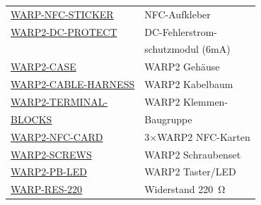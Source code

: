 \documentclass[a4paper,10pt]{article}
\begin{document}
\begin{multicols*}{2}
\begin{tabular}{ll}
        \cmidrule(lr{0.5em}){1-2}
        \href{https://www.tinkerforge.com/de/shop/warp/warp2-spare-parts/warp-nfc-sticker.html}{WARP-NFC-STICKER}                   & NFC-Aufkleber                        \\
        \cmidrule(lr{0.5em}){1-2}
        \href{https://www.tinkerforge.com/de/shop/warp/warp2-spare-parts/warp2-dc-protect.html}{WARP2-DC-PROTECT}                   & DC-Fehlerstrom-                      \\
                                                                                                                                    & schutzmodul (6mA)                    \\
        \cmidrule(lr{0.5em}){1-2}
        \href{https://www.tinkerforge.com/de/shop/warp/warp2-spare-parts.html}{WARP2-CASE}                                          & WARP2 Gehäuse                        \\
        \cmidrule(lr{0.5em}){1-2}
        \small{\href{https://www.tinkerforge.com/de/shop/warp/warp2-spare-parts/warp2-cable-harness.html}{WARP2-CABLE-HARNESS}}     & WARP2 Kabelbaum                      \\
        \cmidrule(lr{0.5em}){1-2}
        \href{https://www.tinkerforge.com/de/shop/warp/warp2-spare-parts/warp2-terminal-blocks.html}{WARP2-TERMINAL-}               & WARP2 Klemmen-                       \\
        \href{https://www.tinkerforge.com/de/shop/warp/warp2-spare-parts/warp2-terminal-blocks.html}{BLOCKS}                        & Baugruppe                            \\
        \cmidrule(lr{0.5em}){1-2}
        \href{https://www.tinkerforge.com/de/shop/warp/warp2-spare-parts/warp2-nfc-karte.html}{WARP2-NFC-CARD}                      & 3$\times$WARP2 NFC-Karten            \\
        \cmidrule(lr{0.5em}){1-2}
        \href{https://www.tinkerforge.com/de/shop/warp/warp2-spare-parts/warp2-screws.html}{WARP2-SCREWS}                           & WARP2 Schraubenset                   \\
        \cmidrule(lr{0.5em}){1-2}
        \href{https://www.tinkerforge.com/de/shop/warp/warp2-spare-parts/warp2-pb-led-set.html}{WARP2-PB-LED}                       & WARP2 Taster/LED                     \\
        \cmidrule(lr{0.5em}){1-2}
        \href{https://www.tinkerforge.com/de/shop/warp/warp2-spare-parts/warp-res-220.html}{WARP-RES-220}                           & Widerstand \SI{220}{\ohm}            \\

\end{tabular}
\end{multicols*}
\end{document}
